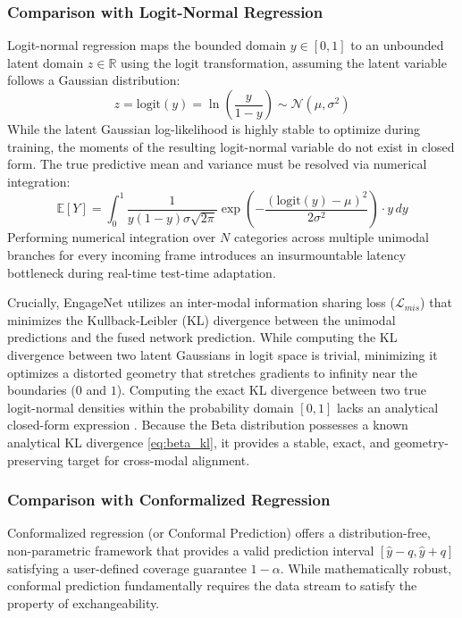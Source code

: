 \documentclass[11pt,a4paper]{article}
\newcommand{\R}{\mathbb{R}}
\begin{document}
	\subsubsection*{Comparison with Logit-Normal Regression}
	Logit-normal regression maps the bounded domain $y \in [0,1]$ to an unbounded latent domain $z \in \R$ using the logit transformation, assuming the latent variable follows a Gaussian distribution:
	$$z = \text{logit}(y) = \ln\left(\frac{y}{1-y}\right) \sim \mathcal{N}(\mu, \sigma^2)$$
	While the latent Gaussian log-likelihood is highly stable to optimize during training, the moments of the resulting logit-normal variable do not exist in closed form. The true predictive mean and variance must be resolved via numerical integration:
	$$\mathbb{E}[Y] = \int_{0}^{1} \frac{1}{y(1-y)\sigma\sqrt{2\pi}} \exp\left( -\frac{(\text{logit}(y) - \mu)^2}{2\sigma^2} \right) \cdot y \, dy$$
	Performing numerical integration over $N$ categories across multiple unimodal branches for every incoming frame introduces an insurmountable latency bottleneck during real-time test-time adaptation. 
	
	Crucially, EngageNet utilizes an inter-modal information sharing loss ($\mathcal{L}_{mis}$) that minimizes the Kullback-Leibler (KL) divergence between the unimodal predictions and the fused network prediction. While computing the KL divergence between two latent Gaussians in logit space is trivial, minimizing it optimizes a distorted geometry that stretches gradients to infinity near the boundaries ($0$ and $1$). Computing the exact KL divergence between two true logit-normal densities within the probability domain $[0,1]$ lacks an analytical closed-form expression \cite{aitchison1980}. Because the Beta distribution possesses a known analytical KL divergence \ref{eq:beta_kl}, it provides a stable, exact, and geometry-preserving target for cross-modal alignment.
	
	\subsubsection*{Comparison with Conformalized Regression}
	Conformalized regression (or Conformal Prediction) \cite{romano2019} offers a distribution-free, non-parametric framework that provides a valid prediction interval $[ \hat{y} - q, \hat{y} + q ]$ satisfying a user-defined coverage guarantee $1 - \alpha$. While mathematically robust, conformal prediction fundamentally requires the data stream to satisfy the property of exchangeability. 
	
\end{document}
